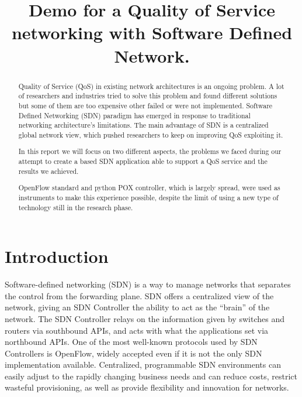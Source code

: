 \documentclass[article,10pt]{IEEEtran}
\begin{document}
\title{Demo for a Quality of Service networking with Software Defined Network.}

\author{
}

\maketitle		

\begin{abstract}
Quality of Service (QoS) in existing network architectures is an ongoing problem.
A lot of researchers and industries tried to solve this problem and found different solutions but some of them are too
expensive other failed or were not implemented.
Software Defined Networking (SDN) paradigm has emerged in response to traditional networking architecture's limitations.
The main advantage of SDN is a centralized global network view, which pushed researchers to keep on improving QoS exploiting it.

In this report we will focus on two different aspects, the problems we faced during our attempt to create a based SDN application able to
support a QoS service and the results we achieved.

OpenFlow standard and python POX controller, which is largely spread, were used as instruments to make this experience possible,
despite the limit of using a new type of technology still in the research phase.
\end{abstract}

\section{Introduction}\label{sec:intro}
Software-defined networking (SDN) is a way to manage networks that separates the control from the forwarding plane.
SDN offers a centralized view of the network, giving an SDN Controller the ability to act as the “brain” of the network.
The SDN Controller relays on the information given by switches and routers via southbound APIs, and acts with what the applications set via northbound APIs.
One of the most well-known protocols used by SDN Controllers is OpenFlow, widely accepted even if it is not the only SDN implementation available. 
Centralized, programmable SDN environments can easily adjust to the rapidly changing business needs and can reduce costs, restrict
wasteful provisioning, as well as provide flexibility and innovation for networks.
\end{document}
